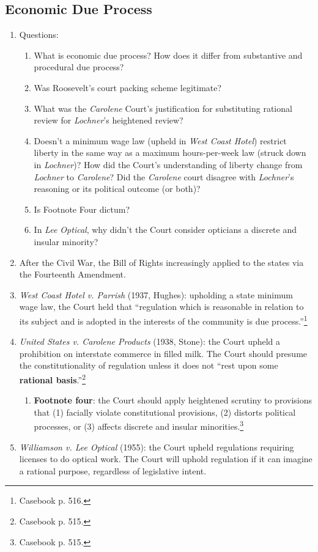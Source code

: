\subsection{Economic Due Process}

\begin{enumerate}
    \item Questions:
    \begin{enumerate}
        \item What is economic due process? How does it differ from 
        substantive and procedural due process? 
        \item Was Roosevelt's court packing scheme legitimate?
        \item What was the \emph{Carolene} Court's justification for substituting 
        rational review for \emph{Lochner}'s heightened review?
        \item Doesn't a minimum wage law (upheld in \emph{West Coast Hotel}) 
        restrict liberty in the same way as a maximum hours-per-week law (struck 
        down in \emph{Lochner})? How did the Court's understanding of liberty 
        change from \emph{Lochner} to \emph{Carolene}? Did the \emph{Carolene} 
        court disagree with \emph{Lochner}'s reasoning or its political 
        outcome (or both)?
        \item Is Footnote Four dictum?
        \item In \emph{Lee Optical}, why didn't the Court consider opticians a 
        discrete and insular minority?
    \end{enumerate}
    \item After the Civil War, the Bill of Rights increasingly applied to the 
    states via the Fourteenth Amendment.
    \item \emph{West Coast Hotel v. Parrish} (1937, Hughes): upholding a state 
    minimum wage law, the Court held that ``regulation which is reasonable in 
    relation to its subject and is adopted in the interests of the community 
    is due process.''\footnote{Casebook p. 516.}
    \item \emph{United States v. Carolene Products} (1938, Stone): the Court 
    upheld a prohibition on interstate commerce in filled milk. The Court 
    should presume the constitutionality of regulation unless it does not 
    ``rest upon some \textbf{rational basis}.''\footnote{Casebook p. 515.} 
    \begin{enumerate}
        \item \textbf{Footnote four}: the Court should apply heightened 
        scrutiny to provisions that (1) facially violate constitutional 
        provisions, (2) distorts political processes, or (3) affects discrete 
        and insular minorities.\footnote{Casebook p. 515.}
    \end{enumerate}
    \item \emph{Williamson v. Lee Optical} (1955): the Court upheld 
    regulations requiring licenses to do optical work. The Court will uphold 
    regulation if it can imagine a rational purpose, regardless of legislative 
    intent.
\end{enumerate}


